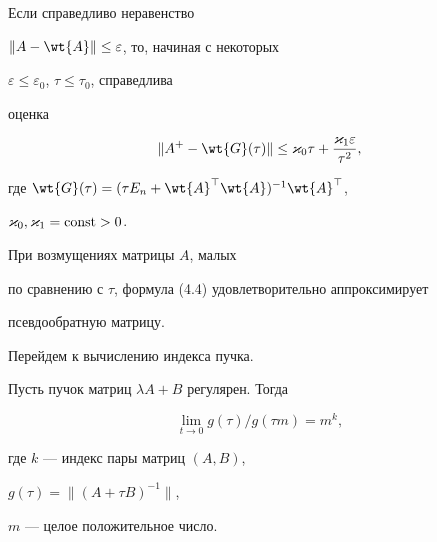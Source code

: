 \begin{lems}


Если справедливо неравенство


$\| A-\wt {A}\| \leq \varepsilon $, то, начиная с некоторых


$ \varepsilon \leq \varepsilon _0$, $\tau \leq \tau _0$, справедлива


оценка


\begin{equation}


\| A^{+}-\wt {G}(\tau )\|


\leq \varkappa _0\tau +\frac {\varkappa _1\varepsilon } {\tau ^2},


\end{equation}


где $\wt {G}(\tau )=


(\tau E_{n} + \wt {A}^{\top }\wt {A})^{-1}\wt {A}^{\top }$,


$\varkappa _0, \varkappa _1 =\operatorname{const} >0$.


\end{lems}





При возмущениях матрицы $A$, малых


по сравнению с $\tau $, формула (4.4) удовлетворительно аппроксимирует


псевдообратную матрицу.





Перейдем к вычислению индекса пучка.





\begin{lems}


Пусть пучок матриц $\lambda A+B$ регулярен. Тогда


\begin{equation}


\lim \limits _{t\to 0}g(\tau )/g(\tau m)=m^{k},


\end{equation}


где $k$ --- индекс пары матриц $(A,B)$,


$g(\tau )=\| {(A+\tau B)}^{-1}\|$,


$m$ --- целое положительное число.


\end{lems}





